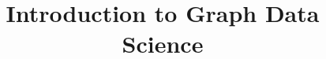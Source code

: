 \documentclass[xcolor=dvipsnames,compress,t,pdf,9pt]{beamer}
\title[\insertframenumber /\inserttotalframenumber]{Introduction to Graph Data Science}
\begin{document}
	\begin{frame}
	\titlepage
	\end{frame}
	
	
	
\end{document}
